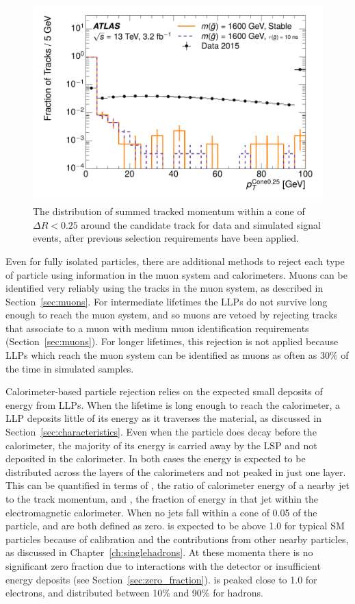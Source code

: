 \begin{figure}[h]
\centering
\includegraphics[width=\fullfig]{figures/selection_isopt_nm1.pdf}
\caption{The distribution of summed tracked momentum within a cone of $\Delta R < 0.25$ around the candidate track for data and simulated signal events, after previous selection requirements have been applied.}
\label{fig:nm1_isopt}
\end{figure}

Even for fully isolated particles, there are additional methods to reject each type of particle using information in the muon system and calorimeters.
Muons can be identified very reliably using the tracks in the muon system, as described in Section~\ref{sec:muons}.
For intermediate lifetimes the \acp{LLP} do not survive long enough to reach the muon system, and so muons are vetoed by rejecting tracks that associate to a muon with medium muon identification requirements (Section~\ref{sec:muons}).
For longer lifetimes, this rejection is not applied because \acp{LLP} which reach the muon system can be identified as muons as often as 30\% of the time in simulated samples.

Calorimeter-based particle rejection relies on the expected small deposits of energy from \acp{LLP}. 
When the lifetime is long enough to reach the calorimeter, a \ac{LLP} deposits little of its energy as it traverses the material, as discussed in Section~\ref{sec:characteristics}. 
Even when the particle does decay before the calorimeter, the majority of its energy is carried away by the \ac{LSP} and not deposited in the calorimeter.
In both cases the energy is expected to be distributed across the layers of the calorimeters and not peaked in just one layer. 
This can be quantified in terms of \ep, the ratio of calorimeter energy of a nearby jet to the track momentum, and \emfrac, the fraction of energy in that jet within the electromagnetic calorimeter.
When no jets fall within a cone of 0.05 of the particle, \ep and \emfrac are both defined as zero.
\ep is expected to be above 1.0 for typical \ac{SM} particles because of calibration and the contributions from other nearby particles, as discussed in Chapter~\ref{ch:singlehadrons}.
At these momenta there is no significant zero fraction due to interactions with the detector or insufficient energy deposits (see Section~\ref{sec:zero_fraction}). 
\emfrac is peaked close to 1.0 for electrons, and distributed between 10\% and 90\% for hadrons.

